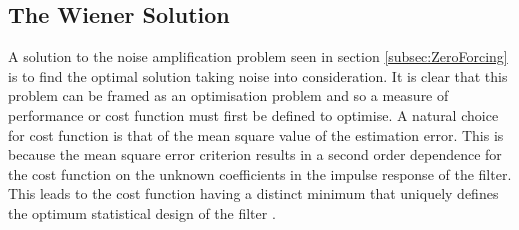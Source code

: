 \subsection{The Wiener Solution}
A solution to the noise amplification problem seen in %
section \ref{subsec:ZeroForcing} is to find the optimal %
solution taking noise into consideration. It is clear that %
this problem can be framed as an optimisation problem %
and so a measure of performance or cost function must %
first be defined to optimise. A natural choice for cost function %
is that of the mean square value of the estimation error. This %
is because the mean square error criterion results in a %
second order dependence for the cost function on the %
unknown coefficients in the impulse response of %
the filter. This leads to the cost function having a distinct %
minimum that uniquely defines the optimum %
statistical design of the filter \cite{Hay02}.
